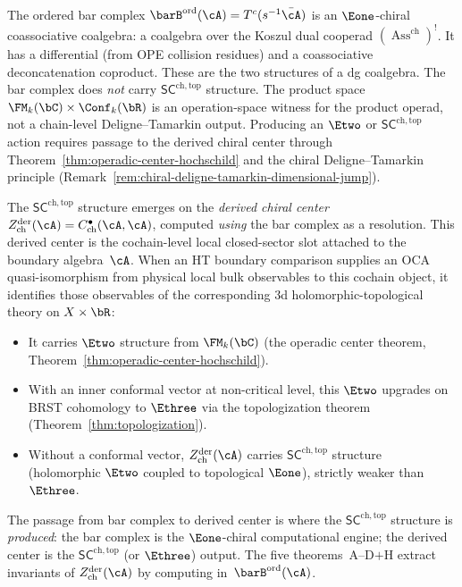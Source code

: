 \begin{principle}
\label{princ:sc-two-incarnations}
The ordered bar complex
$\barB^{\mathrm{ord}}(\cA) = T^c(s^{-1}\bar{\cA})$
is an $\Eone$-chiral coassociative coalgebra: a coalgebra
over the Koszul dual cooperad
$(\operatorname{Ass}^{\mathrm{ch}})^{\scriptstyle !}$.
It has a differential (from OPE collision residues) and a
coassociative deconcatenation coproduct. These are the two
structures of a dg coalgebra. The bar complex does \emph{not}
carry $\mathsf{SC}^{\mathrm{ch,top}}$ structure.
The product space $\FM_k(\bC)\times\Conf_k(\bR)$ is an
operation-space witness for the product operad, not a chain-level
Deligne--Tamarkin output. Producing an $\Etwo$ or
$\mathsf{SC}^{\mathrm{ch,top}}$ action requires passage to the
derived chiral center through
Theorem~\textup{\ref{thm:operadic-center-hochschild}} and the
chiral Deligne--Tamarkin principle
\textup{(}Remark~\textup{\ref{rem:chiral-deligne-tamarkin-dimensional-jump}}\textup{)}.

The $\mathsf{SC}^{\mathrm{ch,top}}$ structure emerges on
the \emph{derived chiral center}
$Z^{\mathrm{der}}_{\mathrm{ch}}(\cA)
= C^{\bullet}_{\mathrm{ch}}(\cA, \cA)$,
computed \emph{using} the bar complex as a resolution.
This derived center is the cochain-level local closed-sector slot attached to
the boundary algebra~$\cA$.  When an HT boundary comparison supplies an
OCA quasi-isomorphism from physical local bulk observables to this
cochain object, it identifies those observables of the corresponding
3d holomorphic-topological theory on $X \times \bR$:
\begin{itemize}
\item It carries $\Etwo$ structure from
 $\FM_k(\bC)$ (the operadic center theorem,
 Theorem~\textup{\ref{thm:operadic-center-hochschild}}).
\item With an inner conformal vector at non-critical level,
 this $\Etwo$ upgrades on BRST cohomology to $\Ethree$ via the
 topologization theorem
 (Theorem~\textup{\ref{thm:topologization}}).
\item Without a conformal vector,
 $Z^{\mathrm{der}}_{\mathrm{ch}}(\cA)$ carries
 $\mathsf{SC}^{\mathrm{ch,top}}$ structure
 (holomorphic $\Etwo$ coupled to topological $\Eone$),
 strictly weaker than $\Ethree$.
\end{itemize}
The passage from bar complex to derived center is
where the $\mathsf{SC}^{\mathrm{ch,top}}$ structure
is \emph{produced}: the bar complex is the $\Eone$-chiral
computational engine; the derived center is the
$\mathsf{SC}^{\mathrm{ch,top}}$ (or $\Ethree$) output.
The five theorems~A--D$+$H extract invariants of
$Z^{\mathrm{der}}_{\mathrm{ch}}(\cA)$ by computing
in~$\barB^{\mathrm{ord}}(\cA)$.
\end{principle}

